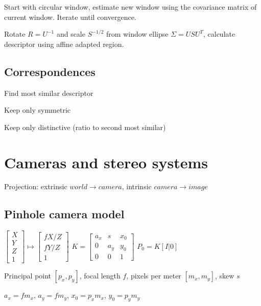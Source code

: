 \documentclass{article}
\begin{document}
\begin{multicols*}{2}
{	Start with circular window, estimate new window using the covariance matrix of current window. Iterate until convergence.

	Rotate $R=U^{-1}$ and scale $S^{-1/2}$ from window ellipse $\Sigma = USU^T$, calculate descriptor using affine adapted region.

	\subsection{Correspondences}

	\begin{compactitem}
		\item Find most similar descriptor
		\item Keep only symmetric
		\item Keep only distinctive (ratio to second most similar)
	\end{compactitem}

	\section{Cameras and stereo systems}

	Projection: extrinsic $world \to camera$, intrinsic $camera \to image$


	\subsection{Pinhole camera model}

	$\left[ \begin{array}{c}
				X \\ Y \\ Z \\ 1
			\end{array} \right]
		\mapsto
		\left[ \begin{array}{c}
				fX/Z \\ fY/Z \\ 1
			\end{array} \right]
	$
	$K = \left[ \begin{array}{ccc}
				a_x & s   & x_0 \\
				0   & a_y & y_0 \\
				0   & 0   & 1
			\end{array} \right]$
	$P_0 = K[I|0]$

	Principal point $[p_x, p_y]$, focal length $f$, pixels per meter $[m_x, m_y]$, skew $s$

	$a_x = f m_x$, $a_y = f m_y$, $x_0 = p_x m_x$, $y_0 = p_y m_y$

}
\end{multicols*}
\end{document}

